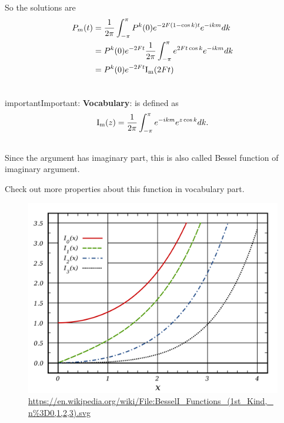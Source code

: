 \documentclass[letterpaper,10pt,english]{sphinxmanual}
\begin{document}
So the solutions are
\begin{gather}
\begin{split}P_m(t) &= \frac{1}{2\pi} \int _{-\pi}^{\pi} P^k(0) e^{-2F(1-\cos{k})t} e^{-ikm} dk \\ &=  P^k(0)  e^{-2Ft} \frac{1}{2\pi} \int_{-\pi}^{\pi} e^{2Ft\cos{k}} e^{-ikm} dk \\
& = P^k(0)  e^{-2Ft} \mathrm{I_m}(2Ft)\end{split}\notag\\\begin{split}\end{split}\notag
\end{gather}
\begin{notice}{important}{Important:}
\textbf{Vocabulary}:  is defined as
\begin{gather}
\begin{split}\mathrm{I_m} (z) = \frac{1}{2\pi}\int_{-\pi}^{\pi} e^{-ikm} e^{z\cos{k}} dk  .\end{split}\notag\\\begin{split}\end{split}\notag
\end{gather}
Since the argument has imaginary part, this is also called Bessel function of imaginary argument.

Check out more properties about this function in vocabulary part.
\begin{figure}[htbp]
\centering
\capstart

\includegraphics[width=1.000\linewidth]{besselIFunctions1stKind.png}
\caption{\href{https://en.wikipedia.org/wiki/File:BesselI\_Functions\_(1st\_Kind,\_n\%3D0,1,2,3).svg}{https://en.wikipedia.org/wiki/File:BesselI\_Functions\_(1st\_Kind,\_n\%3D0,1,2,3).svg}}\end{figure}
\end{notice}
\end{document}
